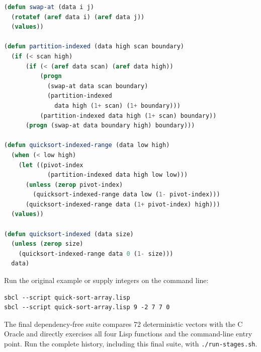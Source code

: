 \documentclass[fontsize=16pt]{scrartcl}
\begin{document}
\begin{lstlisting}[language=Lisp,basicstyle=\ttfamily\footnotesize]
(defun swap-at (data i j)
  (rotatef (aref data i) (aref data j))
  (values))

(defun partition-indexed (data high scan boundary)
  (if (< scan high)
      (if (< (aref data scan) (aref data high))
          (progn
            (swap-at data scan boundary)
            (partition-indexed
              data high (1+ scan) (1+ boundary)))
          (partition-indexed data high (1+ scan) boundary))
      (progn (swap-at data boundary high) boundary)))

(defun quicksort-indexed-range (data low high)
  (when (< low high)
    (let ((pivot-index
            (partition-indexed data high low low)))
      (unless (zerop pivot-index)
        (quicksort-indexed-range data low (1- pivot-index)))
      (quicksort-indexed-range data (1+ pivot-index) high)))
  (values))

(defun quicksort-indexed (data size)
  (unless (zerop size)
    (quicksort-indexed-range data 0 (1- size)))
  data)
\end{lstlisting}

Run the original example or supply integers on the command line:

\begin{lstlisting}
sbcl --script quick-sort-array.lisp
sbcl --script quick-sort-array.lisp 9 -2 7 7 0
\end{lstlisting}

The final dependency-free suite compares 72 deterministic vectors with the C
Oracle and directly exercises all four Lisp functions and the command-line entry
point.  Run the complete history, including this final suite, with
\texttt{./run-stages.sh}.
\end{document}
